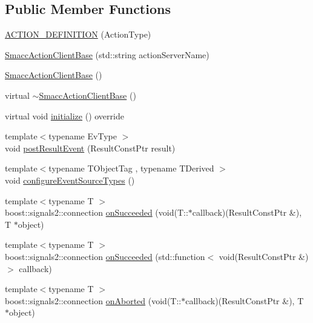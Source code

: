 \subsection*{Public Member Functions}
\begin{DoxyCompactItemize}
\item 
\hyperlink{classsmacc_1_1client__bases_1_1SmaccActionClientBase_a2936b800b46ac557550cbeda563209b3}{A\+C\+T\+I\+O\+N\+\_\+\+D\+E\+F\+I\+N\+I\+T\+I\+ON} (Action\+Type)
\item 
\hyperlink{classsmacc_1_1client__bases_1_1SmaccActionClientBase_af38f27dd26f8a87fea6b3eaa4a84e604}{Smacc\+Action\+Client\+Base} (std\+::string action\+Server\+Name)
\item 
\hyperlink{classsmacc_1_1client__bases_1_1SmaccActionClientBase_a942113f29871c3e2c3fff9e951500805}{Smacc\+Action\+Client\+Base} ()
\item 
virtual \hyperlink{classsmacc_1_1client__bases_1_1SmaccActionClientBase_aa6daf2d88aa6254e5a5c10b2c2152fad}{$\sim$\+Smacc\+Action\+Client\+Base} ()
\item 
virtual void \hyperlink{classsmacc_1_1client__bases_1_1SmaccActionClientBase_a72967f255f85e35718a1e1b0b48c38ff}{initialize} () override
\item 
{\footnotesize template$<$typename Ev\+Type $>$ }\\void \hyperlink{classsmacc_1_1client__bases_1_1SmaccActionClientBase_ad84470e029cc996685f44ad0d4062c29}{post\+Result\+Event} (Result\+Const\+Ptr result)
\item 
{\footnotesize template$<$typename T\+Object\+Tag , typename T\+Derived $>$ }\\void \hyperlink{classsmacc_1_1client__bases_1_1SmaccActionClientBase_a8d8e9c0be98ab5bf0ed666fd2fa0892b}{configure\+Event\+Source\+Types} ()
\item 
{\footnotesize template$<$typename T $>$ }\\boost\+::signals2\+::connection \hyperlink{classsmacc_1_1client__bases_1_1SmaccActionClientBase_af6d77c27d21b2e4f621f53c5f1df088b}{on\+Succeeded} (void(T\+::$\ast$callback)(Result\+Const\+Ptr \&), T $\ast$object)
\item 
{\footnotesize template$<$typename T $>$ }\\boost\+::signals2\+::connection \hyperlink{classsmacc_1_1client__bases_1_1SmaccActionClientBase_a92053df4ebfd0e49bbbd4ba191bf3975}{on\+Succeeded} (std\+::function$<$ void(Result\+Const\+Ptr \&)$>$ callback)
\item 
{\footnotesize template$<$typename T $>$ }\\boost\+::signals2\+::connection \hyperlink{classsmacc_1_1client__bases_1_1SmaccActionClientBase_a75c58162621a705bfd11efdf068eb06b}{on\+Aborted} (void(T\+::$\ast$callback)(Result\+Const\+Ptr \&), T $\ast$object)

\end{DoxyCompactItemize}
